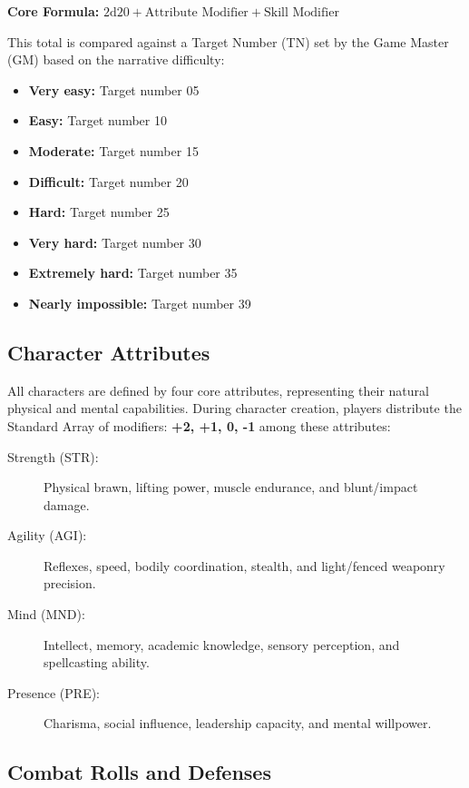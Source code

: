 \begin{center}
    \textbf{Core Formula: } $2\text{d}20 + \text{Attribute Modifier} + \text{Skill Modifier}$
\end{center}

This total is compared against a Target Number (TN) set by the Game Master (GM) based on the narrative difficulty:

\begin{itemize}
    \item \textbf{Very easy:} Target number 05
    \item \textbf{Easy:} Target number 10
    \item \textbf{Moderate:} Target number 15
    \item \textbf{Difficult:} Target number 20
    \item \textbf{Hard:} Target number 25
    \item \textbf{Very hard:} Target number 30
    \item \textbf{Extremely hard:} Target number 35
    \item \textbf{Nearly impossible:} Target number 39
\end{itemize}

\subsection{Character Attributes}

All characters are defined by four core attributes, representing their natural physical and mental capabilities. During character creation, players distribute the Standard Array of modifiers: \textbf{+2, +1, 0, -1} among these attributes:

\begin{description}
    \item[Strength (STR):] Physical brawn, lifting power, muscle endurance, and blunt/impact damage.
    \item[Agility (AGI):] Reflexes, speed, bodily coordination, stealth, and light/fenced weaponry precision.
    \item[Mind (MND):] Intellect, memory, academic knowledge, sensory perception, and spellcasting ability.
    \item[Presence (PRE):] Charisma, social influence, leadership capacity, and mental willpower.
\end{description}

\subsection{Combat Rolls and Defenses}

